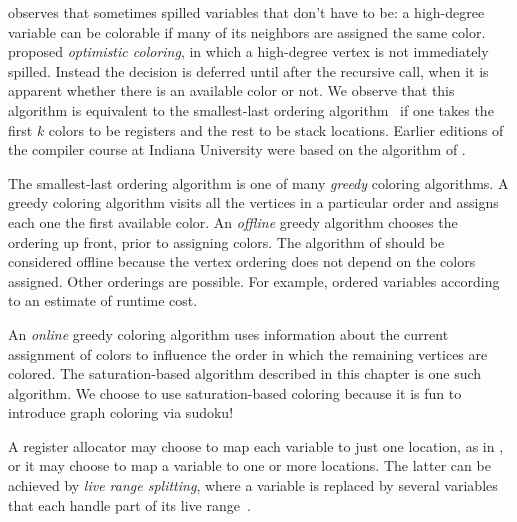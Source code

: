 \documentclass[7x10]{TimesAPriori_MIT}%
\numberwithin{theorem}{chapter}
\numberwithin{definition}{chapter}
\numberwithin{equation}{chapter}
\begin{document}
\citet{Briggs:1994kx} observes that \citet{Chaitin:1982vn} sometimes
spilled variables that don't have to be: a high-degree variable can be
colorable if many of its neighbors are assigned the same color.
\citet{Briggs:1994kx} proposed \emph{optimistic coloring}, in which a
high-degree vertex is not immediately spilled. Instead the decision is
deferred until after the recursive call, when it is apparent whether
there is an available color or not. We observe that this algorithm is
equivalent to the smallest-last ordering
algorithm~\citep{Matula:1972aa} if one takes the first $k$ colors to
be registers and the rest to be stack locations.
Earlier editions of the compiler course at Indiana University
\citep{Dybvig:2010aa} were based on the algorithm of
\citet{Briggs:1994kx}.

The smallest-last ordering algorithm is one of many \emph{greedy}
coloring algorithms. A greedy coloring algorithm visits all the
vertices in a particular order and assigns each one the first
available color. An \emph{offline} greedy algorithm chooses the
ordering up front, prior to assigning colors. The algorithm of
\citet{Chaitin:1981vl} should be considered offline because the vertex
ordering does not depend on the colors assigned.  Other orderings are
possible. For example, \citet{Chow:1984ys} ordered variables according
to an estimate of runtime cost.

An \emph{online} greedy coloring algorithm uses information about the
current assignment of colors to influence the order in which the
remaining vertices are colored. The saturation-based algorithm
described in this chapter is one such algorithm. We choose to use
saturation-based coloring because it is fun to introduce graph
coloring via sudoku!

A register allocator may choose to map each variable to just one
location, as in \citet{Chaitin:1981vl}, or it may choose to map a
variable to one or more locations. The latter can be achieved by
\emph{live range splitting}, where a variable is replaced by several
variables that each handle part of its live
range~\citep{Chow:1984ys,Briggs:1994kx,Cooper:1998ly}.



\end{document}
